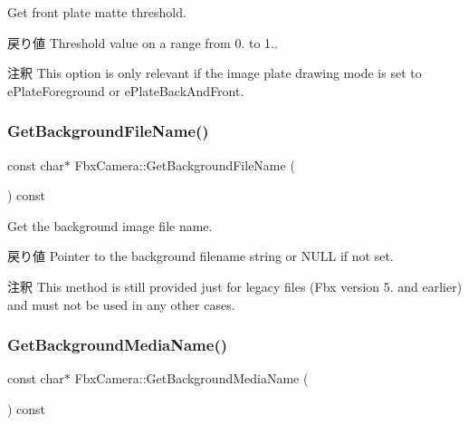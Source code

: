 Get front plate matte threshold. \begin{DoxyReturn}{戻り値}
Threshold value on a range from 0. to 1.. 
\end{DoxyReturn}
\begin{DoxyRemark}{注釈}
This option is only relevant if the image plate drawing mode is set to e\+Plate\+Foreground or e\+Plate\+Back\+And\+Front. 
\end{DoxyRemark}
\mbox{\label{class_fbx_camera_a1de8f9aa601c8a2e12c501da3a419bc8}} 
\subsubsection{\texorpdfstring{Get\+Background\+File\+Name()}{GetBackgroundFileName()}}
{\footnotesize\ttfamily const char$\ast$ Fbx\+Camera\+::\+Get\+Background\+File\+Name (\begin{DoxyParamCaption}{ }\end{DoxyParamCaption}) const}

Get the background image file name. \begin{DoxyReturn}{戻り値}
Pointer to the background filename string or {\ttfamily N\+U\+LL} if not set. 
\end{DoxyReturn}
\begin{DoxyRemark}{注釈}
This method is still provided just for legacy files (Fbx version 5. and earlier) and must not be used in any other cases. 
\end{DoxyRemark}
\mbox{\label{class_fbx_camera_a00a5854e8b375a9888eae08ae4ce7552}} 
\subsubsection{\texorpdfstring{Get\+Background\+Media\+Name()}{GetBackgroundMediaName()}}
{\footnotesize\ttfamily const char$\ast$ Fbx\+Camera\+::\+Get\+Background\+Media\+Name (\begin{DoxyParamCaption}{ }\end{DoxyParamCaption}) const}

